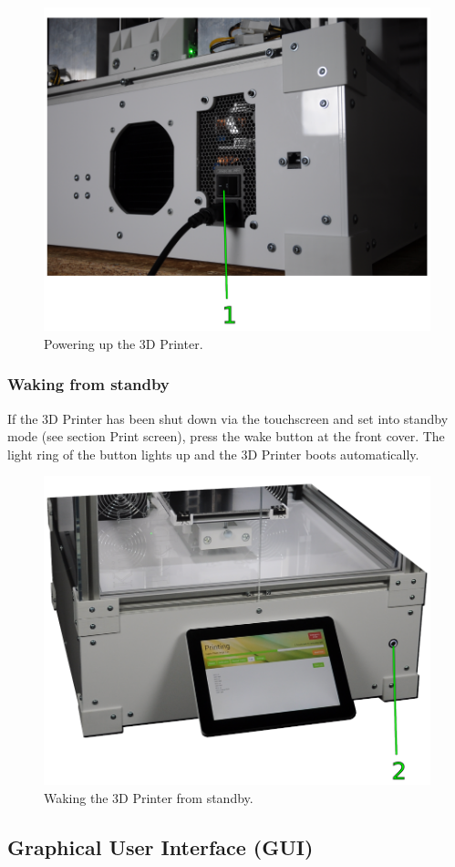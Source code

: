 \begin{figure}[H]
  \centering
  \includegraphics[width=.7\linewidth]{./img/opm_powerbutton.png}
  \caption{Powering up the 3D Printer.}
\end{figure}


\subsubsection{Waking from standby}

If the 3D Printer has been shut down via the touchscreen and set into standby mode (see section Print screen), press the wake button at the front cover. The light ring of the button lights up and the 3D Printer boots automatically.

\begin{figure}[H]
  \centering
  \includegraphics[width=.7\linewidth]{./img/opm_wakebutton.png}
  \caption{Waking the 3D Printer from standby.}
\end{figure}


\subsection{Graphical User Interface (GUI)}

